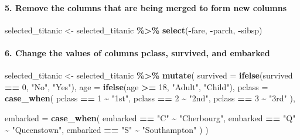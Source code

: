 \documentclass[
]{article}
\newenvironment{Shaded}{\begin{snugshade}}{\end{snugshade}}
\newcommand{\AttributeTok}[1]{\textcolor[rgb]{0.13,0.29,0.53}{#1}}
\newcommand{\DecValTok}[1]{\textcolor[rgb]{0.00,0.00,0.81}{#1}}
\newcommand{\FunctionTok}[1]{\textcolor[rgb]{0.13,0.29,0.53}{\textbf{#1}}}
\newcommand{\NormalTok}[1]{#1}
\newcommand{\OtherTok}[1]{\textcolor[rgb]{0.56,0.35,0.01}{#1}}
\newcommand{\SpecialCharTok}[1]{\textcolor[rgb]{0.81,0.36,0.00}{\textbf{#1}}}
\newcommand{\StringTok}[1]{\textcolor[rgb]{0.31,0.60,0.02}{#1}}
\begin{document}
\paragraph{5. Remove the columns that are being merged to form new
columns}\label{remove-the-columns-that-are-being-merged-to-form-new-columns}

\begin{Shaded}
\begin{Highlighting}[]
\NormalTok{selected\_titanic }\OtherTok{\textless{}{-}}\NormalTok{ selected\_titanic }\SpecialCharTok{\%\textgreater{}\%} 
  \FunctionTok{select}\NormalTok{(}\SpecialCharTok{{-}}\NormalTok{fare, }\SpecialCharTok{{-}}\NormalTok{parch, }\SpecialCharTok{{-}}\NormalTok{sibsp)}
\end{Highlighting}
\end{Shaded}

\paragraph{6. Change the values of columns pclass, survived, and
embarked}\label{change-the-values-of-columns-pclass-survived-and-embarked}

\begin{Shaded}
\begin{Highlighting}[]
\NormalTok{selected\_titanic }\OtherTok{\textless{}{-}}\NormalTok{ selected\_titanic }\SpecialCharTok{\%\textgreater{}\%}
  \FunctionTok{mutate}\NormalTok{(}
    \AttributeTok{survived =} \FunctionTok{ifelse}\NormalTok{(survived }\SpecialCharTok{==} \DecValTok{0}\NormalTok{, }\StringTok{"No"}\NormalTok{, }\StringTok{"Yes"}\NormalTok{),}
    \AttributeTok{age =} \FunctionTok{ifelse}\NormalTok{(age }\SpecialCharTok{\textgreater{}=} \DecValTok{18}\NormalTok{, }\StringTok{"Adult"}\NormalTok{, }\StringTok{"Child"}\NormalTok{),}
    \AttributeTok{pclass =} \FunctionTok{case\_when}\NormalTok{(}
\NormalTok{      pclass }\SpecialCharTok{==} \DecValTok{1} \SpecialCharTok{\textasciitilde{}} \StringTok{"1st"}\NormalTok{,}
\NormalTok{      pclass }\SpecialCharTok{==} \DecValTok{2} \SpecialCharTok{\textasciitilde{}} \StringTok{"2nd"}\NormalTok{,}
\NormalTok{      pclass }\SpecialCharTok{==} \DecValTok{3} \SpecialCharTok{\textasciitilde{}} \StringTok{"3rd"}
\NormalTok{    ),}
    
    \AttributeTok{embarked =} \FunctionTok{case\_when}\NormalTok{(}
\NormalTok{      embarked }\SpecialCharTok{==} \StringTok{"C"} \SpecialCharTok{\textasciitilde{}} \StringTok{"Cherbourg"}\NormalTok{,}
\NormalTok{      embarked }\SpecialCharTok{==} \StringTok{"Q"} \SpecialCharTok{\textasciitilde{}} \StringTok{"Queenstown"}\NormalTok{,}
\NormalTok{      embarked }\SpecialCharTok{==} \StringTok{"S"} \SpecialCharTok{\textasciitilde{}} \StringTok{"Southampton"}
\NormalTok{    )}
\NormalTok{  )}
\end{Highlighting}
\end{Shaded}
\end{document}
